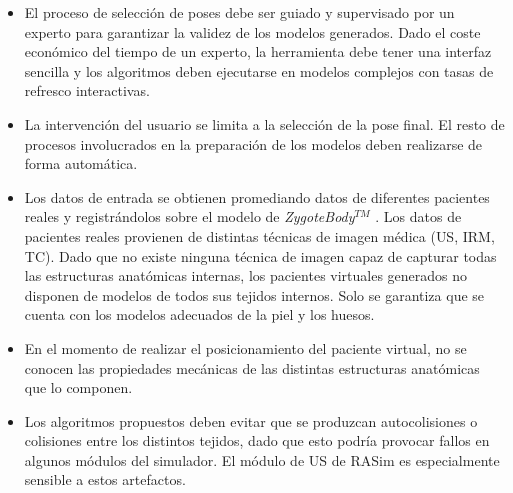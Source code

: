 \begin{itemize}
    \item El proceso de selección de poses debe ser guiado y supervisado por un experto para garantizar la validez de los modelos generados. Dado el coste económico del tiempo de un experto, la herramienta debe tener una interfaz sencilla y los algoritmos deben ejecutarse en modelos complejos con tasas de refresco interactivas.
    \item La intervención del usuario se limita a la selección de la pose final. El resto de procesos involucrados en la preparación de los modelos deben realizarse de forma automática.
    \item Los datos de entrada se obtienen promediando datos de diferentes pacientes reales y registrándolos sobre el modelo de \emph{ZygoteBody}$^{TM}$ \cite{kelc2012zygote}. Los datos de pacientes reales provienen de distintas técnicas de imagen médica (\ac{US}, \ac{IRM}, \ac{TC}). Dado que no existe ninguna técnica de imagen capaz de capturar todas las estructuras anatómicas internas, los pacientes virtuales generados no disponen de modelos de todos sus tejidos internos. Solo se garantiza que se cuenta con los modelos adecuados de la piel y los huesos. 
    \item En el momento de realizar el posicionamiento del paciente virtual, no se conocen las propiedades mecánicas de las distintas estructuras anatómicas que lo componen.
    \item Los algoritmos propuestos deben evitar que se produzcan autocolisiones o colisiones entre los distintos tejidos, dado que esto podría provocar fallos en  algunos módulos del simulador. El módulo de \ac{US} de \ac{RASim} es especialmente sensible a estos artefactos.

\end{itemize}
